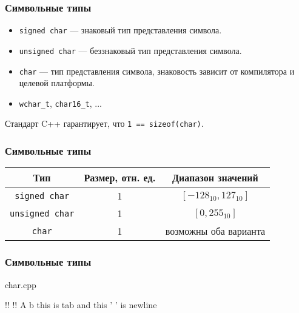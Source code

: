 \documentclass[compress, 8pt]{beamer}
\begin{document}
\begin{frame}[fragile]

    \frametitle{Символьные типы}

    \begin{itemize}
        \item \verb|signed char| --- знаковый тип представления символа.
        \item \verb|unsigned char| --- беззнаковый тип представления символа.
        \item \verb|char| --- тип представления символа, знаковость зависит от
            компилятора и целевой платформы.
        \item \verb|wchar_t|, \verb|char16_t|, ...
    \end{itemize}

    \hfill \break
    Стандарт C++ гарантирует, что \verb|1 == sizeof(char)|.

\end{frame}

\begin{frame}[fragile]

    \frametitle{Символьные типы}

    \begin{center}
        \begin{tabular}{|c|c|c|}
            \hline
            Тип & Размер, отн. ед. & Диапазон значений \\
            \hline
            \hline
            \verb|signed char| & 1 & \([-128_{10}, 127_{10}]\) \\
            \verb|unsigned char| & 1 & \([0, 255_{10}]\) \\
            \verb|char| & 1 & возможны оба варианта \\
            \hline
        \end{tabular}
    \end{center}

\end{frame}

\begin{frame}[fragile]

    \frametitle{Символьные типы}

        {char.cpp}

    \begin{terminalwindow}
!!
!!
A
b
this is tab     and this '
' is newline
    \end{terminalwindow}

\end{frame}
\end{document}
